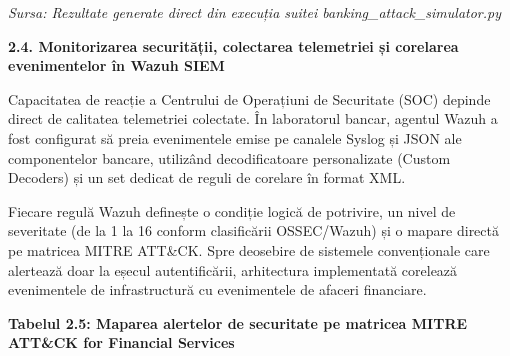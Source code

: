 \documentclass[
]{article}
\begin{document}
\emph{Sursa: Rezultate generate direct din execuția suitei
banking\_attack\_simulator.py}

\textbf{2.4. Monitorizarea securității, colectarea telemetriei și
corelarea evenimentelor în Wazuh SIEM}

Capacitatea de reacție a Centrului de Operațiuni de Securitate (SOC)
depinde direct de calitatea telemetriei colectate. În laboratorul
bancar, agentul Wazuh a fost configurat să preia evenimentele emise pe
canalele Syslog și JSON ale componentelor bancare, utilizând
decodificatoare personalizate (Custom Decoders) și un set dedicat de
reguli de corelare în format XML.

Fiecare regulă Wazuh definește o condiție logică de potrivire, un nivel
de severitate (de la 1 la 16 conform clasificării OSSEC/Wazuh) și o
mapare directă pe matricea MITRE ATT\&CK. Spre deosebire de sistemele
convenționale care alertează doar la eșecul autentificării, arhitectura
implementată corelează evenimentele de infrastructură cu evenimentele de
afaceri financiare.

\textbf{Tabelul 2.5: Maparea alertelor de securitate pe matricea MITRE
ATT\&CK for Financial Services}
\end{document}
